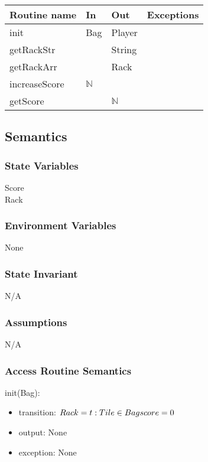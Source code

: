 \documentclass[12pt]{article}
\begin{document}
\begin{tabular}{| l | l | l | l |}
\hline
\textbf{Routine name} & \textbf{In} & \textbf{Out} & \textbf{Exceptions}\\
\hline
init & Bag & Player &  \\
\hline
getRackStr & & String & \\
\hline
getRackArr & & Rack & \\
\hline
increaseScore & $\mathbb{N}$ &  & \\
\hline
getScore & & $\mathbb{N}$ & \\
\hline
\end{tabular}

\subsection* {Semantics}

\subsubsection* {State Variables}

Score \\
Rack

\subsubsection* {Environment Variables}
None
\subsubsection* {State Invariant}

N/A

\subsubsection* {Assumptions}

N/A

\begin{itemize}

\end{itemize}

\subsubsection* {Access Routine Semantics}

\noindent init(Bag):
\begin{itemize}
\item transition: $Rack = {t : Tile \in Bag}\\
score = 0$
\item output: None
\item exception: None
\end{itemize}
\end{document}

